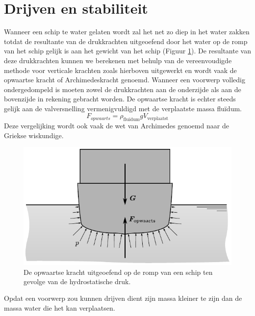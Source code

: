 	\section{Drijven en stabiliteit}
Wanneer een schip te water gelaten wordt zal het net zo diep in het water zakken totdat de resultante van de drukkrachten uitgeoefend door het water op de romp van het schip gelijk is aan het gewicht van het schip (Figuur \ref{fig:opwaartse_kracht}). De resultante van deze drukkrachten kunnen we berekenen met behulp van de vereenvoudigde methode voor verticale krachten zoals hierboven uitgewerkt en wordt vaak de opwaartse kracht of Archimedeskracht genoemd. Wanneer een voorwerp volledig ondergedompeld is moeten zowel de drukkrachten aan de onderzijde als aan de bovenzijde in rekening gebracht worden. De opwaartse kracht is echter steeds gelijk aan de valversnelling vermenigvuldigd met de verplaatste massa fluïdum.
\begin{equation}
	F_{opwaarts} = \rho_{\text{fluïdum}} g V_{\text{verplaatst}}
\end{equation}
Deze vergelijking wordt ook vaak de wet van Archimedes genoemd naar de Griekse wiskundige.
\begin{figure}[htb]
	\centering
	\includegraphics{fig/hydrostatica/opwaartse_kracht}
	\caption{De opwaartse kracht uitgeoefend op de romp van een schip ten gevolge van de hydrostatische druk.}
	\label{fig:opwaartse_kracht}
\end{figure}

Opdat een voorwerp zou kunnen drijven dient zijn massa kleiner te zijn dan de massa water die het kan verplaatsen.

